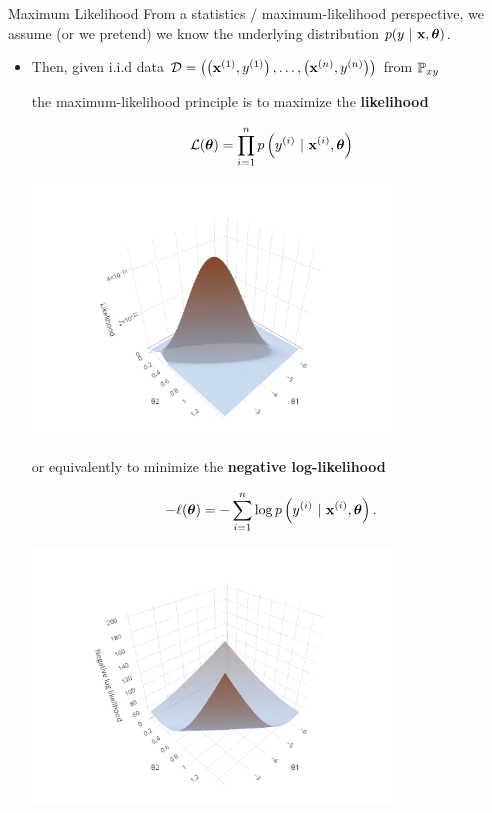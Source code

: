 \documentclass[11pt,compress,t,notes=noshow, xcolor=table]{beamer}
\begin{document}
\begin{vbframe}{Maximum Likelihood}
From a statistics / maximum-likelihood perspective, we assume (or we pretend) we know the underlying distribution $p(y~|~\mathbf{x}, \bm{\theta})$.

\begin{itemize}
\item Then, given i.i.d data $
\mathcal{D} = \left( \left(\mathbf{x}^{(1)}, y^{(1)}\right), \ldots, \left(\mathbf{x}^{(n)}, y^{(n)}\right)\right)
$
 from $\mathbb{P}_{xy}$ 

the maximum-likelihood principle is to maximize the \textbf{likelihood}

\begin{minipage}{0.5\textwidth}
$$ \mathcal{L}(\bm{\theta}) = \prod_{i=1}^n p\left(y^{(i)} ~|~\mathbf{x}^{(i)}, \bm{\theta}\right) $$
\end{minipage}%
\begin{minipage}{0.5\textwidth}
\includegraphics[width = 0.75\textwidth]{figure/log_reg_ml.pdf}
\end{minipage}

or equivalently to minimize the \textbf{negative log-likelihood}

\begin{minipage}{0.5\textwidth}
$$ -\ell(\bm{\theta}) = -\sum\limits_{i=1}^n \log p\left(y^{(i)} ~|~\mathbf{x}^{(i)}, \bm{\theta}\right). $$
\end{minipage}%
\begin{minipage}{0.5\textwidth}
\includegraphics[width = 0.75\textwidth]{figure/log_reg_erm.pdf}
\end{minipage}
\end{itemize}



\end{vbframe}
\end{document}
